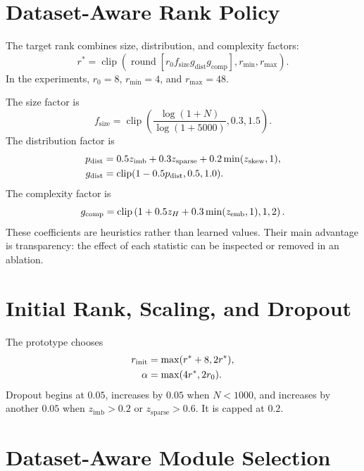 \section{Dataset-Aware Rank Policy}

The target rank combines size, distribution, and complexity factors:
\begin{equation}
  r^* =
  \operatorname{clip}\left(
  \operatorname{round}
  \left[
  r_0 f_{\mathrm{size}}g_{\mathrm{dist}}g_{\mathrm{comp}}
  \right],
  r_{\min},r_{\max}
  \right).
  \label{eq:rank-policy}
\end{equation}
In the experiments, $r_0=8$, $r_{\min}=4$, and $r_{\max}=48$.

The size factor is
\begin{equation}
  f_{\mathrm{size}} =
  \operatorname{clip}\left(
  \frac{\log(1+N)}{\log(1+5000)},0.3,1.5
  \right).
  \label{eq:size-factor}
\end{equation}
The distribution factor is
\begin{align}
  p_{\mathrm{dist}} &=
  0.5z_{\mathrm{imb}}+
  0.3z_{\mathrm{sparse}}+
  0.2\mathop{\rm min}\limits(z_{\mathrm{skew}},1),\\
  g_{\mathrm{dist}} &=
  \operatorname{clip}(1-0.5p_{\mathrm{dist}},0.5,1.0).
  \label{eq:distribution-factor}
\end{align}
The complexity factor is
\begin{equation}
  g_{\mathrm{comp}} =
  \operatorname{clip}
  \left(
  1+0.5z_H+0.3\mathop{\rm min}\limits(z_{\mathrm{emb}},1),
  1,2
  \right).
  \label{eq:complexity-factor}
\end{equation}
These coefficients are heuristics rather than learned values. Their main advantage is
transparency: the effect of each statistic can be inspected or removed in an ablation.

\section{Initial Rank, Scaling, and Dropout}

The prototype chooses
\begin{align}
  r_{\mathrm{init}} &= \mathop{\rm max}\limits(r^*+8,2r^*),\\
  \alpha &= \mathop{\rm max}\limits(4r^*,2r_0).
\end{align}
Dropout begins at $0.05$, increases by $0.05$ when $N<1000$, and increases by another $0.05$ when
$z_{\mathrm{imb}}>0.2$ or $z_{\mathrm{sparse}}>0.6$. It is capped at $0.2$.

\section{Dataset-Aware Module Selection}

